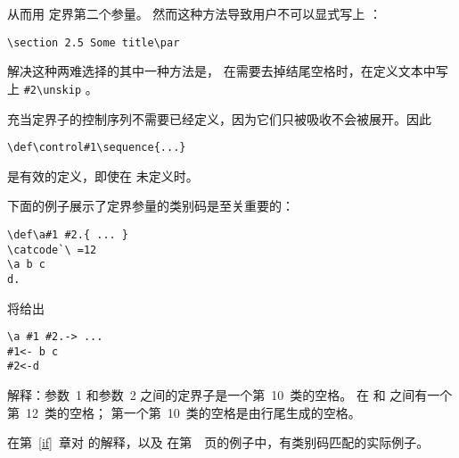 \documentclass[letterpaper]{book}
\begin{document}
从而用  定界第二个参量。
然而这种方法导致用户不可以显式写上 ：
\begin{verbatim}
\section 2.5 Some title\par
\end{verbatim}
解决这种两难选择的其中一种方法是，
在需要去掉结尾空格时，在定义文本中写上 \verb>#2\unskip> 。

充当定界子的控制序列不需要已经定义，因为它们只被吸收不会被展开。因此
\begin{verbatim}
\def\control#1\sequence{...}
\end{verbatim}
是有效的定义，即使在  未定义时。

下面的例子展示了定界参量的类别码是至关重要的：
\begin{verbatim}
\def\a#1 #2.{ ... }
\catcode`\ =12
\a b c
d.
\end{verbatim}
将给出
\begin{verbatim}
\a #1 #2.-> ...
#1<- b c
#2<-d
\end{verbatim}
解释：参数~1 和参数~2 之间的定界子是一个第~10~类的空格。
在  和  之间有一个第~12~类的空格；
第一个第~10~类的空格是由行尾生成的空格。

在第~\ref{if}~章对  的解释，以及
在第~\pageref{ex:jobnumber}~页的例子中，有类别码匹配的实际例子。
\end{document}
